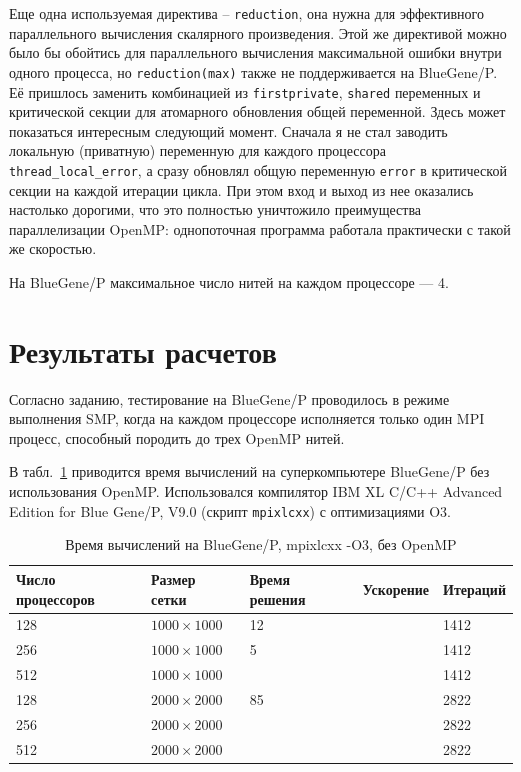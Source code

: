 \documentclass[12pt,notitlepage,oneside]{extarticle}
\begin{document}
Еще одна используемая директива -- \texttt{reduction}, она нужна для
эффективного параллельного вычисления скалярного произведения. Этой же
директивой можно было бы обойтись для параллельного вычисления максимальной
ошибки внутри одного процесса, но \texttt{reduction(max)} также не
поддерживается на BlueGene/P. Её пришлось заменить комбинацией из
\texttt{firstprivate}, \texttt{shared} переменных и критической секции для
атомарного обновления общей переменной. Здесь может показаться интересным
следующий момент. Сначала я не стал заводить локальную (приватную) переменную
для каждого процессора \texttt{thread\_local\_error}, а сразу обновлял общую
переменную \texttt{error} в критической секции на каждой итерации цикла.
При этом вход и выход из нее оказались настолько дорогими, что это полностью
уничтожило преимущества параллелизации OpenMP: однопоточная программа работала
практически с такой же скоростью.

На BlueGene/P максимальное число нитей на каждом процессоре --- 4.

\section{Результаты расчетов}
Согласно заданию, тестирование на BlueGene/P проводилось в режиме выполнения
SMP, когда на каждом процессоре исполняется только один MPI процесс, способный
породить до трех OpenMP нитей.

В табл.~\ref{bg:table} приводится время вычислений на суперкомпьютере BlueGene/P
без использования OpenMP. Использовался компилятор IBM XL C/C++ Advanced Edition
for Blue Gene/P, V9.0 (скрипт \texttt{mpixlcxx}) с оптимизациями O3.

\begin{table}[h]
\centering
\caption{Время вычислений на BlueGene/P, mpixlcxx -O3, без OpenMP}
\label{bg:table}
\begin{tabular}{|l|l|l|l|l|}
\textbf{Число процессоров} & \textbf{Размер сетки} & \textbf{Время решения} & \textbf{Ускорение}      & \textbf{Итераций}        \\ \hline
128                        & $1000 \times 1000 $        & 12                     &                    & 1412                     \\
256                        & $1000 \times 1000 $        & 5                      &                    & 1412                         \\
512                        & $1000 \times 1000 $        &                        &                    & 1412                         \\ \hline
128                        & $2000 \times 2000 $        & 85                     &                    & 2822                     \\
256                        & $2000 \times 2000 $        &                        &                    & 2822                         \\
512                        & $2000 \times 2000 $        &                        &                    & 2822
\end{tabular}
\end{table}
\end{document}
